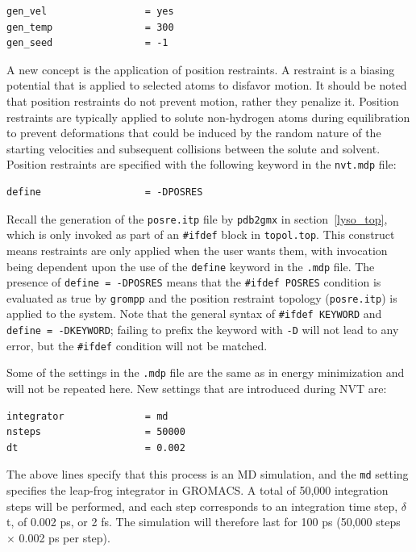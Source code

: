 \documentclass[9pt,tutorial,pubversion]{livecoms}
\begin{document}
\begin{lstlisting}
gen_vel                 = yes
gen_temp                = 300
gen_seed                = -1
\end{lstlisting}

A new concept is the application of position restraints. A restraint is a biasing potential that is applied to selected atoms to disfavor motion. It should be noted that position restraints do not prevent motion, rather they penalize it. Position restraints are typically applied to solute non-hydrogen atoms during equilibration to prevent deformations that could be induced by the random nature of the starting velocities and subsequent collisions between the solute and solvent. Position restraints are specified with the following keyword in the \texttt{nvt.mdp} file:

\begin{lstlisting}
define                  = -DPOSRES
\end{lstlisting}

Recall the generation of the \texttt{posre.itp} file by \texttt{pdb2gmx} in section~\ref{lyso_top}, which is only invoked as part of an \texttt{\#ifdef} block in \texttt{topol.top}. This construct means restraints are only applied when the user wants them, with invocation being dependent upon the use of the \texttt{define} keyword in the \texttt{.mdp} file. The presence of \texttt{define = -DPOSRES} means that the \texttt{\#ifdef POSRES} condition is evaluated as true by \texttt{grompp} and the position restraint topology (\texttt{posre.itp}) is applied to the system. Note that the general syntax of \texttt{\#ifdef KEYWORD} and \texttt{define = -DKEYWORD}; failing to prefix the keyword with \texttt{-D} will not lead to any error, but the \texttt{\#ifdef} condition will not be matched.

Some of the settings in the \texttt{.mdp} file are the same as in energy minimization and will not be repeated here. New settings that are introduced during NVT are:

\begin{lstlisting}
integrator              = md
nsteps                  = 50000
dt                      = 0.002
\end{lstlisting}

The above lines specify that this process is an MD simulation, and the \texttt{md} setting specifies the leap-frog integrator in GROMACS. A total of 50,000 integration steps will be performed, and each step corresponds to an integration time step, $\delta$t, of 0.002 ps, or 2 fs. The simulation will therefore last for 100 ps (50,000 steps $\times$ 0.002 ps per step).
\end{document}
